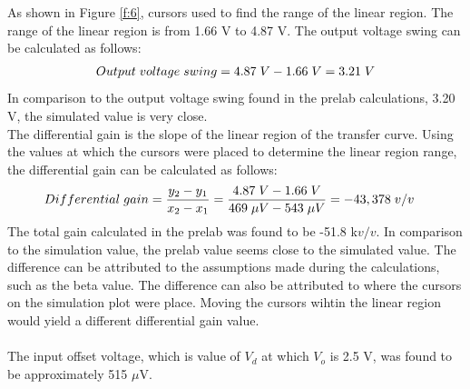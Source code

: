 \documentclass{article}
\begin{document}
	\noindent As shown in Figure \ref{f:6}, cursors used to find the range of the linear region.
	The range of the linear region is from 1.66 V to 4.87 V.
	The output voltage swing can be calculated as follows:
	\begin{align*}
		Output \hspace{1mm} voltage \hspace{1mm} swing = 4.87 \hspace{1mm} V - 1.66 \hspace{1mm} V = 3.21 \hspace{1mm} V
	\end{align*}
	In comparison to the output voltage swing found in the prelab calculations, 3.20 V, the simulated value is very close.\\
	The differential gain is the slope of the linear region of the transfer curve. 
	Using the values at which the cursors were placed to determine the linear region range, the differential gain can be calculated as follows:
	\begin{align*}
		Differential \hspace{1mm} gain &= \frac{y_2 - y_1}{x_2 - x_1} = \frac{4.87 \hspace{1mm} V - 1.66 \hspace{1mm} V}{469 \hspace{1mm} \mu V - 543 \hspace{1mm}\mu V} = -43,378 \hspace{1mm} v/v
	\end{align*}
	The total gain calculated in the prelab was found to be -51.8 k$v/v$. 
	In comparison to the simulation value, the prelab value seems close to the simulated value.
	The difference can be attributed to the assumptions made during the calculations, such as the beta value.
	The difference can also be attributed to where the cursors on the simulation plot were place. 
	Moving the cursors wihtin the linear region would yield a different differential gain value.\\\\
	The input offset voltage, which is value of $V_d$ at which $V_o$ is 2.5 V, was found to be approximately 515 $\mu$V.
	
	\pagebreak
\end{document}
